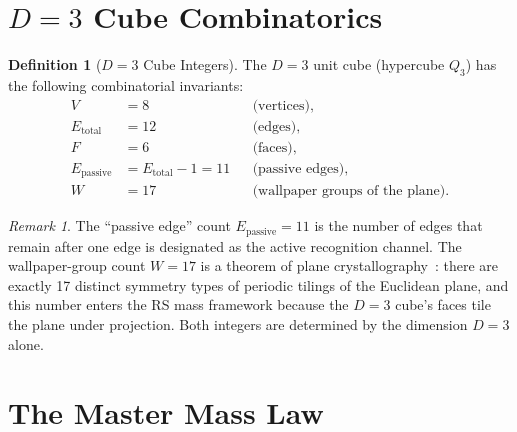 \documentclass[12pt,a4paper]{article}
\theoremstyle{definition}
\newtheorem{definition}[theorem]{Definition}
\theoremstyle{remark}
\newtheorem{remark}[theorem]{Remark}
\begin{document}
\section{$D = 3$ Cube Combinatorics}
\label{sec:cube}

\begin{definition}[$D = 3$ Cube Integers]
\label{def:cube}
The $D = 3$ unit cube (hypercube $Q_3$) has the following
combinatorial invariants:
\begin{align}
  V &= 8 &&\text{(vertices)}, \\
  E_{\mathrm{total}} &= 12 &&\text{(edges)}, \\
  F &= 6 &&\text{(faces)}, \\
  E_{\mathrm{passive}} &= E_{\mathrm{total}} - 1 = 11
    &&\text{(passive edges)}, \\
  W &= 17 &&\text{(wallpaper groups of the plane)}.
\end{align}
\end{definition}

\begin{remark}
The ``passive edge'' count $E_{\mathrm{passive}} = 11$ is the
number of edges that remain after one edge is designated as the
active recognition channel.  The wallpaper-group count $W = 17$
is a theorem of plane crystallography~\cite{Fedorov}: there are
exactly 17 distinct symmetry types of periodic tilings of the
Euclidean plane, and this number enters the RS mass framework
because the $D = 3$ cube's faces tile the plane under
projection.  Both integers are determined by the dimension
$D = 3$ alone.
\end{remark}

\section{The Master Mass Law}
\label{sec:mass-law}
\end{document}
